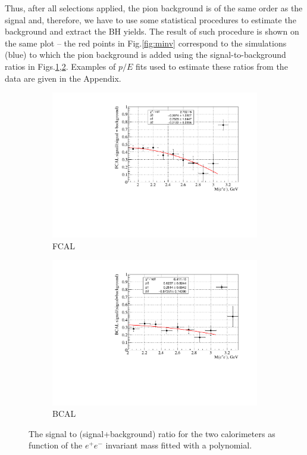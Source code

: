 \documentclass[%
preprint,
nofootinbib,
 amsmath,amssymb,
 aps,
floatfix,
]{revtex4-1}
\begin{document}
Thus, after all selections applied, the pion background is of the same order
as the signal and, therefore, we have to use some statistical procedures
to estimate the background and extract the BH yields.
The result of such procedure is shown on the same plot --
the red points in Fig.\ref{fig:minv} correspond to the simulations (blue) 
to which the pion background is added using 
the signal-to-background ratios in Figs.\ref{fig:sb_FCAL},\ref{fig:sb_BCAL}. 
Examples of $p/E$ fits used to estimate these ratios from the data are given in the Appendix.
\begin{figure}[h]
  \begin{subfigure}[b]{0.49\textwidth}
    \includegraphics[width=\textwidth]{./fig/GEM_TRD_sb_FCAL.pdf}
    \caption{ 
FCAL
}
    \label{fig:sb_FCAL}
  \end{subfigure}
  \begin{subfigure}[b]{0.49\textwidth}
    \includegraphics[width=\textwidth]{./fig/GEM_TRD_sb_BCAL.pdf}
    \caption{ 
BCAL
}
    \label{fig:sb_BCAL}
  \end{subfigure}
  \caption{
The signal to (signal+background) ratio for the two calorimeters as function
of the  $e^+e^-$ invariant mass fitted with a polynomial.
}
  \label{fig:sb}
\end{figure}
\end{document}
